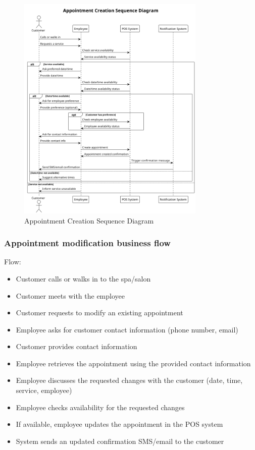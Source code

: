 \documentclass[]{VUMIFTemplateClass}
\begin{document}
\begin{figure}[H]
    \centering
    \includegraphics[width=0.8\textwidth]{images/diagrams/services/appointment_creation_sequence.png}
    \caption{Appointment Creation Sequence Diagram}
    \label{fig:appointment_creation_sequence}
\end{figure}

\subsubsection{Appointment modification business flow}

Flow:
\begin{itemize}
    \setlength{\itemsep}{2pt}
    \setlength{\parskip}{0pt}
    \setlength{\parsep}{0pt}
    \item Customer calls or walks in to the spa/salon
    \item Customer meets with the employee
    \item Customer requests to modify an existing appointment
    \item Employee asks for customer contact information (phone number, email)
    \item Customer provides contact information
    \item Employee retrieves the appointment using the provided contact information
    \item Employee discusses the requested changes with the customer (date, time, service, employee)
    \item Employee checks availability for the requested changes
    \item If available, employee updates the appointment in the POS system
    \item System sends an updated confirmation SMS/email to the customer
\end{itemize}
\end{document}
